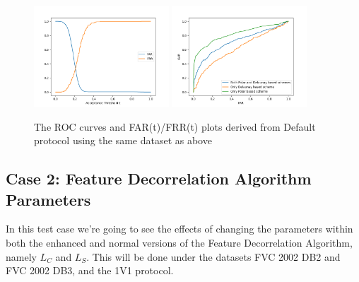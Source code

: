 \documentclass[fyp]{socreport}
\begin{document}
\begin{figure}[H]
	\centering
	\includegraphics[width=0.45\textwidth]
	{FARFRR}
	\includegraphics[width=0.45\textwidth]
	{33ROC}
	\caption{The ROC curves and FAR(t)/FRR(t) plots derived from Default protocol using the same dataset as above}
\end{figure}

\subsection{Case 2: Feature Decorrelation Algorithm Parameters}
In this test case we're going to see the effects of changing the parameters within both the enhanced and normal versions of the Feature Decorrelation Algorithm, namely $L_C$ and $L_S$. This will be done under the datasets FVC 2002 DB2 and FVC 2002 DB3, and the 1V1 protocol.
\end{document}
